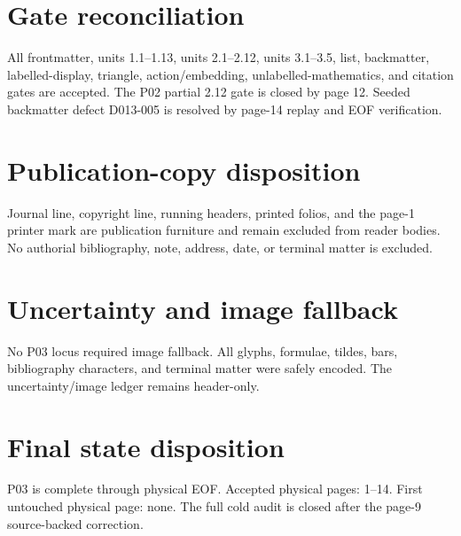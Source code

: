 \documentclass[10pt]{article}
\begin{document}
\section*{Gate reconciliation}
All frontmatter, units 1.1--1.13, units 2.1--2.12, units 3.1--3.5, list, backmatter, labelled-display, triangle, action/embedding, unlabelled-mathematics, and citation gates are accepted. The P02 partial 2.12 gate is closed by page 12. Seeded backmatter defect D013-005 is resolved by page-14 replay and EOF verification.

\section*{Publication-copy disposition}
Journal line, copyright line, running headers, printed folios, and the page-1 printer mark are publication furniture and remain excluded from reader bodies. No authorial bibliography, note, address, date, or terminal matter is excluded.

\section*{Uncertainty and image fallback}
No P03 locus required image fallback. All glyphs, formulae, tildes, bars, bibliography characters, and terminal matter were safely encoded. The uncertainty/image ledger remains header-only.

\section*{Final state disposition}
P03 is complete through physical EOF. Accepted physical pages: 1--14. First untouched physical page: none. The full cold audit is closed after the page-9 source-backed correction.
\end{document}
